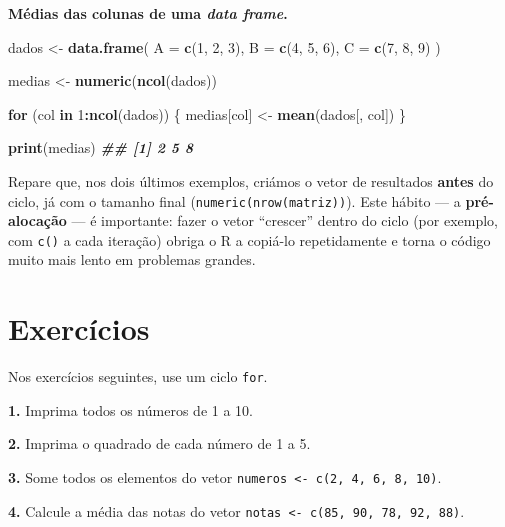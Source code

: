 \documentclass[
  portuguese,
  11pt,
  openany]{book}
\newenvironment{Shaded}{\begin{snugshade}}{\end{snugshade}}
\newcommand{\AttributeTok}[1]{\textcolor[rgb]{0.13,0.29,0.53}{#1}}
\newcommand{\ControlFlowTok}[1]{\textcolor[rgb]{0.13,0.29,0.53}{\textbf{#1}}}
\newcommand{\DecValTok}[1]{\textcolor[rgb]{0.00,0.00,0.81}{#1}}
\newcommand{\DocumentationTok}[1]{\textcolor[rgb]{0.56,0.35,0.01}{\textbf{\textit{#1}}}}
\newcommand{\FunctionTok}[1]{\textcolor[rgb]{0.13,0.29,0.53}{\textbf{#1}}}
\newcommand{\NormalTok}[1]{#1}
\newcommand{\OtherTok}[1]{\textcolor[rgb]{0.56,0.35,0.01}{#1}}
\newcommand{\SpecialCharTok}[1]{\textcolor[rgb]{0.81,0.36,0.00}{\textbf{#1}}}
\begin{document}
\textbf{Médias das colunas de uma \emph{data frame}.}

\begin{Shaded}
\begin{Highlighting}[]
\NormalTok{dados }\OtherTok{\textless{}{-}} \FunctionTok{data.frame}\NormalTok{(}
  \AttributeTok{A =} \FunctionTok{c}\NormalTok{(}\DecValTok{1}\NormalTok{, }\DecValTok{2}\NormalTok{, }\DecValTok{3}\NormalTok{),}
  \AttributeTok{B =} \FunctionTok{c}\NormalTok{(}\DecValTok{4}\NormalTok{, }\DecValTok{5}\NormalTok{, }\DecValTok{6}\NormalTok{),}
  \AttributeTok{C =} \FunctionTok{c}\NormalTok{(}\DecValTok{7}\NormalTok{, }\DecValTok{8}\NormalTok{, }\DecValTok{9}\NormalTok{)}
\NormalTok{)}

\NormalTok{medias }\OtherTok{\textless{}{-}} \FunctionTok{numeric}\NormalTok{(}\FunctionTok{ncol}\NormalTok{(dados))}

\ControlFlowTok{for}\NormalTok{ (col }\ControlFlowTok{in} \DecValTok{1}\SpecialCharTok{:}\FunctionTok{ncol}\NormalTok{(dados)) \{}
\NormalTok{  medias[col] }\OtherTok{\textless{}{-}} \FunctionTok{mean}\NormalTok{(dados[, col])}
\NormalTok{\}}

\FunctionTok{print}\NormalTok{(medias)}
\DocumentationTok{\#\# [1] 2 5 8}
\end{Highlighting}
\end{Shaded}

Repare que, nos dois últimos exemplos, criámos o vetor de resultados \textbf{antes} do
ciclo, já com o tamanho final (\texttt{numeric(nrow(matriz))}). Este hábito --- a
\textbf{pré-alocação} --- é importante: fazer o vetor ``crescer'' dentro do ciclo (por
exemplo, com \texttt{c()} a cada iteração) obriga o R a copiá-lo repetidamente e torna o
código muito mais lento em problemas grandes.

\section{Exercícios}\label{exercuxedcios-12}

Nos exercícios seguintes, use um ciclo \texttt{for}.

\textbf{1.} Imprima todos os números de 1 a 10.

\textbf{2.} Imprima o quadrado de cada número de 1 a 5.

\textbf{3.} Some todos os elementos do vetor \texttt{numeros\ \textless{}-\ c(2,\ 4,\ 6,\ 8,\ 10)}.

\textbf{4.} Calcule a média das notas do vetor \texttt{notas\ \textless{}-\ c(85,\ 90,\ 78,\ 92,\ 88)}.
\end{document}
